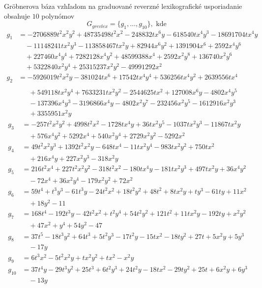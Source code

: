 Gröbnerova báza vzhľadom na graduované reverzné lexikografické usporiadanie obsahuje $10$ polynómov
$$ G_{grevlex} = \{g_1,\dots ,g_{10} \}, \text{ kde } $$
\begin{align*}
g_1 &= -2706889t^2x^2y^2 + 48735498t^2x^2 - 248832tx^6y - 618540tx^4y^3 - 18691704tx^4y\\ 
&\quad - 11148241tx^2y^3 - 113858467tx^2y + 82944x^6y^2 + 1391904x^6 + 2592x^4y^6\\ 
&\quad + 227460x^4y^4 + 7282128x^4y^2 + 48599388x^4 + 2592x^2y^8 + 136740x^2y^6 \\ 
&\quad + 5322840x^2y^4 + 25315237x^2y^2 - 49991292x^2 \\ 
g_2 &= -5926019t^2x^2y - 381024tx^6 + 17542tx^4y^4 + 536256tx^4y^2  + 2639556tx^4 \\ 
\end{align*}
\begin{align*}
&\quad  + 549118tx^2y^4 + 7633231tx^2y^2 - 2544625tx^2 + 127008x^6y - 4802x^4y^5 \\
&\quad  - 137396x^4y^3 - 3196866x^4y - 4802x^2y^7 - 232456x^2y^5 - 1612916x^2y^3 \\ 
&\quad  + 3355951x^2y \\
g_3 &= -257t^2x^2y^2 + 4998t^2x^2 - 1728tx^4y + 36tx^2y^5 - 1037tx^2y^3 - 11867tx^2y \\ 
&\quad  + 576x^4y^2 + 5292x^4 + 540x^2y^4 + 2729x^2y^2 - 5292x^2 \\ 
g_4 &= 49t^2x^2y^3 + 1392t^2x^2y - 648tx^4 - 11tx^2y^4 - 983tx^2y^2 + 750tx^2 \\ 
&\quad  + 216x^4y + 227x^2y^3 - 318x^2y \\ 
g_5 &= 216t^2x^4 + 227t^2x^2y^2 - 318t^2x^2 - 180tx^4y - 181tx^2y^3 + 497tx^2y + 36x^4y^2 \\ 
&\quad - 72x^4 + 36x^2y^4 - 179x^2y^2 + 72x^2 \\ 
g_6 &= 59t^4 + t^3y^3 - 61t^3y - 24t^2x^2 + 18t^2y^2 + 48t^2 + 8tx^2y + ty^3 - 61ty + 11x^2 \\ 
&\quad  + 18y^2 - 11 \\ 
g_7 &= 168t^4 - 192t^3y - 42t^2x^2 + t^2y^4 + 54t^2y^2 + 121t^2 + 11tx^2y - 192ty + x^2y^2 \\ 
&\quad  + 47x^2 + y^4 + 54y^2 - 47 \\ 
g_8 &= 37t^5 - 18t^3y^2 + 64t^3 + 5t^2y^3 - 17t^2y - 15tx^2 - 18ty^2 + 27t + 5x^2y + 5y^3  \\ 
&\quad - 17y \\
g_9 &= 6t^3x^2 - 5t^2x^2y + tx^2y^2 + tx^2 - x^2y \\  
g_{10} &= 37t^4y - 29t^3y^2 + 25t^3 + 6t^2y^3 + 24t^2y - 18tx^2 - 29ty^2 + 25t + 6x^2y + 6y^3 \\
&\quad - 13y \\ 
\end{align*}


 